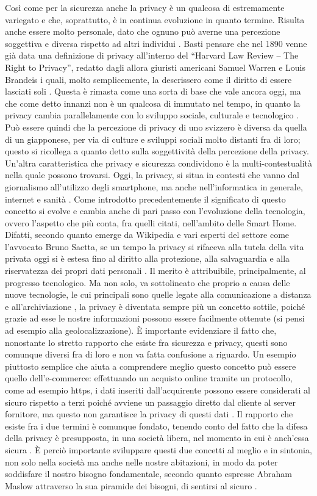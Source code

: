 Così come per la sicurezza anche la privacy è un qualcosa di estremamente variegato e che, soprattutto, è in continua evoluzione in quanto termine. Risulta anche essere molto personale, dato che ognuno può averne una percezione soggettiva e diversa rispetto ad altri individui . Basti pensare che nel 1890 venne già data una definizione di privacy all’interno del “Harvard Law Review – The Right to Privacy”, redatto dagli allora giuristi americani Samuel Warren e Louis Brandeis i quali, molto semplicemente, la descrissero come il diritto di essere lasciati soli . Questa è rimasta come una sorta di base che vale ancora oggi, ma che come detto innanzi non è un qualcosa di immutato nel tempo, in quanto la privacy cambia parallelamente con lo sviluppo sociale, culturale e tecnologico . Può essere quindi che la percezione di privacy di uno svizzero è diversa da quella di un giapponese, per via di culture e sviluppi sociali molto distanti fra di loro; questo si ricollega a quanto detto sulla soggettività della percezione della privacy. Un’altra caratteristica che privacy e sicurezza condividono è la multi-contestualità nella quale possono trovarsi. Oggi, la privacy, si situa in contesti che vanno dal giornalismo all’utilizzo degli smartphone, ma anche nell’informatica in generale, internet e sanità . 
Come introdotto precedentemente il significato di questo concetto si evolve e cambia anche di pari passo con l’evoluzione della tecnologia, ovvero l’aspetto che più conta, fra quelli citati, nell’ambito delle Smart Home. Difatti, secondo quanto emerge da Wikipedia e vari esperti del settore come l’avvocato Bruno Saetta, se un tempo la privacy si rifaceva alla tutela della vita privata oggi si è estesa fino al diritto alla protezione, alla salvaguardia e alla riservatezza dei propri dati personali . Il merito è attribuibile, principalmente, al progresso tecnologico. Ma non solo, va sottolineato che proprio a causa delle nuove tecnologie, le cui principali sono quelle legate alla comunicazione a distanza e all’archiviazione , la privacy è diventata sempre più un concetto sottile, poiché grazie ad esse le nostre informazioni possono essere facilmente ottenute (si pensi ad esempio alla geolocalizzazione).
È importante evidenziare il fatto che, nonostante lo stretto rapporto che esiste fra sicurezza e privacy, questi sono comunque diversi fra di loro e non va fatta confusione a riguardo. Un esempio piuttosto semplice che aiuta a comprendere meglio questo concetto può essere quello dell’e-commerce: effettuando un acquisto online tramite un protocollo, come ad esempio https, i dati inseriti dall’acquirente possono essere considerati al sicuro rispetto a terzi poiché avviene un passaggio diretto dal cliente al server fornitore, ma questo non garantisce la privacy di questi dati . Il rapporto che esiste fra i due termini è comunque fondato, tenendo conto del fatto che la difesa della privacy è presupposta, in una società libera, nel momento in cui è anch’essa sicura . È perciò importante sviluppare questi due concetti al meglio e in sintonia, non solo nella società ma anche nelle nostre abitazioni, in modo da poter soddisfare il nostro bisogno fondamentale, secondo quanto espresse Abraham Maslow attraverso la sua piramide dei bisogni, di sentirsi al sicuro .
